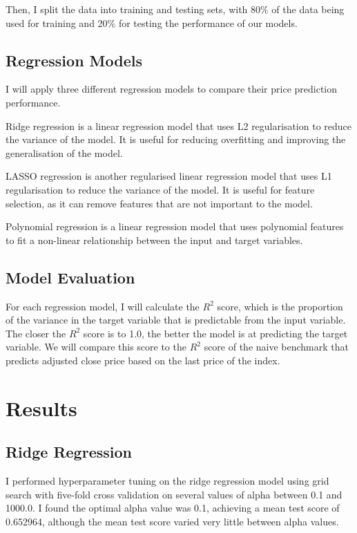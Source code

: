 \documentclass[a4paper, 11pt]{article}
\begin{document}
Then, I split the data into training and testing sets, with 80\% of the data being used for training and 20\% for testing the performance of our models.

\subsection{Regression Models}
I will apply three different regression models to compare their price prediction performance.

Ridge regression is a linear regression model that uses L2 regularisation to reduce the variance of the model. It is useful for reducing overfitting and improving the generalisation of the model.

LASSO regression is another regularised linear regression model that uses L1 regularisation to reduce the variance of the model. It is useful for feature selection, as it can remove features that are not important to the model.

Polynomial regression is a linear regression model that uses polynomial features to fit a non-linear relationship between the input and target variables.

\subsection{Model Evaluation}
For each regression model, I will calculate the $R^2$ score, which is the proportion of the variance in the target variable that is predictable from the input variable. The closer the $R^2$ score is to 1.0, the better the model is at predicting the target variable. We will compare this score to the $R^2$ score of the naive benchmark that predicts adjusted close price based on the last price of the index.

\section{Results}
\subsection{Ridge Regression}
I performed hyperparameter tuning on the ridge regression model using grid search with five-fold cross validation on several values of alpha between 0.1 and 1000.0. I found the optimal alpha value was 0.1, achieving a mean test score of 0.652964, although the mean test score varied very little between alpha values.
\end{document}
